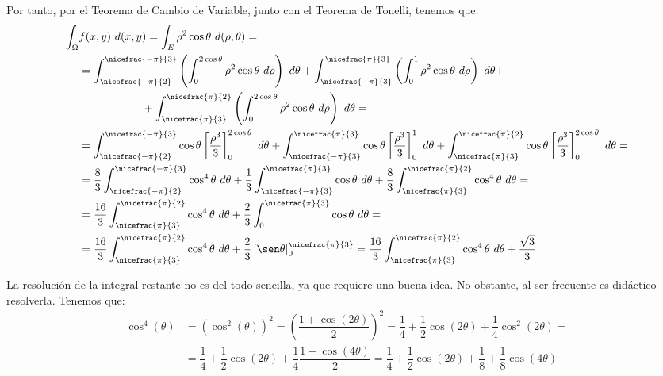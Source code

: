 \begin{ejercicio}
    Por tanto, por el Teorema de Cambio de Variable, junto con el Teorema de Tonelli, tenemos que:
    \begin{align*}
        \int_{\Omega}& f(x, y)~d(x, y) = \int_{E} \rho^2\cos\theta~d(\rho, \theta) =\\
        &= \int_{\nicefrac{-\pi}{2}}^{\nicefrac{-\pi}{3}}\left( \int_0^{2\cos\theta} \rho^2\cos\theta~d\rho \right)~d\theta + \int_{\nicefrac{-\pi}{3}}^{\nicefrac{\pi}{3}}\left( \int_0^1 \rho^2\cos\theta~d\rho \right)~d\theta +\\&\hspace{2cm}+ \int_{\nicefrac{\pi}{3}}^{\nicefrac{\pi}{2}}\left( \int_0^{2\cos\theta} \rho^2\cos\theta~d\rho \right)~d\theta =\\
        &= \int_{\nicefrac{-\pi}{2}}^{\nicefrac{-\pi}{3}}\cos\theta \left[ \dfrac{\rho^3}{3} \right]_0^{2\cos\theta}~d\theta + \int_{\nicefrac{-\pi}{3}}^{\nicefrac{\pi}{3}}\cos\theta \left[ \dfrac{\rho^3}{3} \right]_0^1~d\theta + \int_{\nicefrac{\pi}{3}}^{\nicefrac{\pi}{2}}\cos\theta \left[ \dfrac{\rho^3}{3} \right]_0^{2\cos\theta}~d\theta=\\
        &= \dfrac{8}{3}\int_{\nicefrac{-\pi}{2}}^{\nicefrac{-\pi}{3}}\cos^4\theta~d\theta + \dfrac{1}{3}\int_{\nicefrac{-\pi}{3}}^{\nicefrac{\pi}{3}}\cos\theta~d\theta + \dfrac{8}{3}\int_{\nicefrac{\pi}{3}}^{\nicefrac{\pi}{2}}\cos^4\theta~d\theta =\\
        &= \dfrac{16}{3}\int_{\nicefrac{\pi}{3}}^{\nicefrac{\pi}{2}}\cos^4\theta~d\theta + \dfrac{2}{3}\int_{0}^{\nicefrac{\pi}{3}}\cos\theta~d\theta =\\
        &= \dfrac{16}{3}\int_{\nicefrac{\pi}{3}}^{\nicefrac{\pi}{2}}\cos^4\theta~d\theta + \dfrac{2}{3}\left[\sen\theta\right]_{0}^{\nicefrac{\pi}{3}}
        = \dfrac{16}{3}\int_{\nicefrac{\pi}{3}}^{\nicefrac{\pi}{2}}\cos^4\theta~d\theta + \dfrac{\sqrt{3}}{3}
    \end{align*}
    
    La resolución de la integral restante no es del todo sencilla, ya que requiere una buena idea. No obstante, al ser frecuente es didáctico resolverla. Tenemos que:
    \begin{align*}
        \cos^4(\theta) &= \left(\cos^2(\theta)\right)^2 = \left(\dfrac{1+\cos(2\theta)}{2}\right)^2 = \dfrac{1}{4} + \dfrac{1}{2}\cos(2\theta) + \dfrac{1}{4}\cos^2(2\theta) =\\
        &= \dfrac{1}{4} + \dfrac{1}{2}\cos(2\theta) + \dfrac{1}{4}\dfrac{1+\cos(4\theta)}{2} = \dfrac{1}{4} + \dfrac{1}{2}\cos(2\theta) + \dfrac{1}{8} + \dfrac{1}{8}\cos(4\theta)
    \end{align*}


\end{ejercicio}
